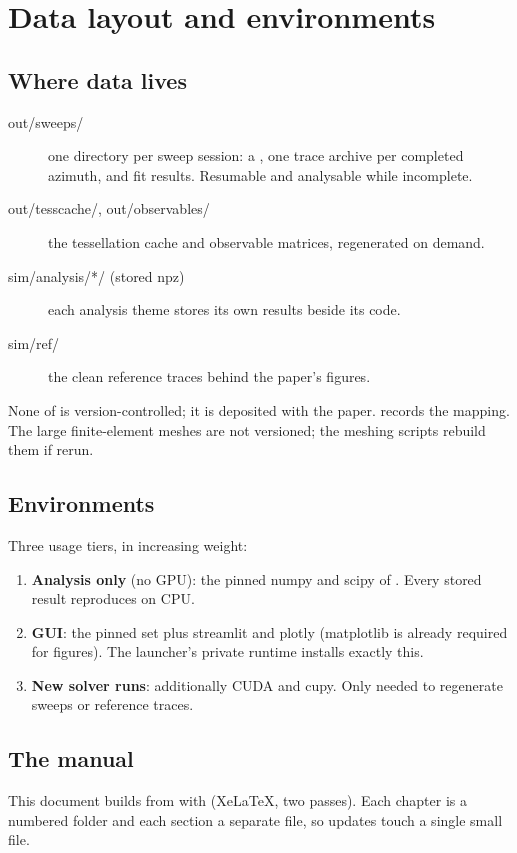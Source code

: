 \section{Data layout and environments}

\subsection{Where data lives}

\begin{description}
  \item[out/sweeps/] one directory per sweep session: a
    , one trace archive per completed azimuth, and
    fit results. Resumable and analysable while incomplete.
  \item[out/tesscache/, out/observables/] the tessellation cache and
    observable matrices, regenerated on demand.
  \item[sim/analysis/*/ (stored npz)] each analysis theme stores its
    own results beside its code.
  \item[sim/ref/] the clean reference traces behind the paper's
    figures.
\end{description}

None of  is version-controlled; it is deposited with the
paper.  records the mapping. The large
finite-element meshes are not versioned; the meshing scripts rebuild
them if rerun.

\subsection{Environments}

Three usage tiers, in increasing weight:

\begin{enumerate}
  \item \textbf{Analysis only} (no GPU): the pinned numpy and scipy
    of . Every stored result reproduces on
    CPU.
  \item \textbf{GUI}: the pinned set plus streamlit and plotly
    (matplotlib is already required for figures). The launcher's
    private runtime installs exactly this.
  \item \textbf{New solver runs}: additionally CUDA and cupy. Only
    needed to regenerate sweeps or reference traces.
\end{enumerate}

\subsection{The manual}

This document builds from  with  (XeLaTeX,
two passes). Each chapter is a numbered folder and each section a
separate file, so updates touch a single small file.

